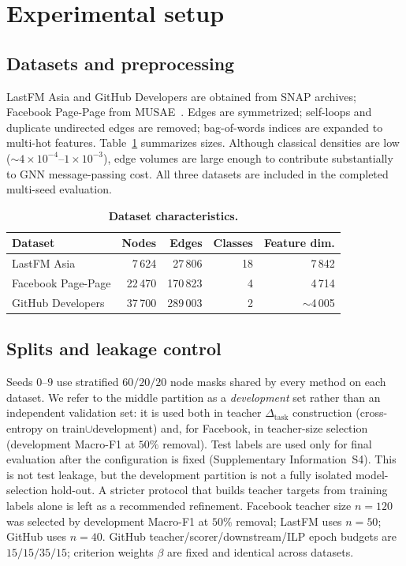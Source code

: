 \section{Experimental setup}
\label{sec:setup}

\subsection{Datasets and preprocessing}
LastFM Asia and GitHub Developers are obtained from SNAP archives; Facebook Page-Page from MUSAE~\citep{rozemberczki2021multi}.
Edges are symmetrized; self-loops and duplicate undirected edges are removed; bag-of-words indices are expanded to multi-hot features.
Table~\ref{tab:datasets} summarizes sizes.
Although classical densities are low (${\sim}4{\times}10^{-4}$--$1{\times}10^{-3}$), edge volumes are large enough to contribute substantially to GNN message-passing cost.
All three datasets are included in the completed multi-seed evaluation.

\begin{table}[t]
\centering
\caption{\textbf{Dataset characteristics.}}
\label{tab:datasets}
\begin{tabular}{@{}lrrrr@{}}
\toprule
Dataset & Nodes & Edges & Classes & Feature dim. \\
\midrule
LastFM Asia & 7\,624 & 27\,806 & 18 & 7\,842 \\
Facebook Page-Page & 22\,470 & 170\,823 & 4 & 4\,714 \\
GitHub Developers & 37\,700 & 289\,003 & 2 & ${\sim}$4\,005 \\
\bottomrule
\end{tabular}
\end{table}

\subsection{Splits and leakage control}
Seeds $0$--$9$ use stratified $60/20/20$ node masks shared by every method on each dataset.
We refer to the middle partition as a \emph{development} set rather than an independent validation set: it is used both in teacher $\Delta_{\mathrm{task}}$ construction (cross-entropy on train$\cup$development) and, for Facebook, in teacher-size selection (development Macro-F1 at $50\%$ removal).
Test labels are used only for final evaluation after the configuration is fixed (Supplementary Information~S4).
This is not test leakage, but the development partition is not a fully isolated model-selection hold-out.
A stricter protocol that builds teacher targets from training labels alone is left as a recommended refinement.
Facebook teacher size $n{=}120$ was selected by development Macro-F1 at $50\%$ removal; LastFM uses $n{=}50$; GitHub uses $n{=}40$.
GitHub teacher/scorer/downstream/ILP epoch budgets are $15/15/35/15$; criterion weights $\beta$ are fixed and identical across datasets.

